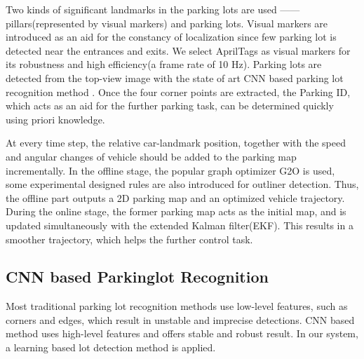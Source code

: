 \documentclass[journal]{IEEEtran}
\begin{document}
Two kinds of significant landmarks in the parking lots are used ——pillars(represented by visual markers) and parking lots. 
Visual markers are introduced as an aid for the constancy of localization since few parking lot is detected near the entrances and exits. 
We select AprilTags as visual markers for its robustness and high efficiency(a frame rate of 10 Hz). 
Parking lots are detected from the top-view image with the state of art CNN based parking lot recognition method \cite{Li2017Vision}. 
Once the four corner points are extracted, the Parking ID, which acts as an aid for the further parking task, can be determined quickly using priori knowledge.
	

At every time step, the relative car-landmark position, together with the speed and angular changes of vehicle should be added to the parking map incrementally. 
In the offline stage, the popular graph optimizer G2O is used, some experimental designed rules are also introduced for outliner detection. 
Thus, the offline part outputs a 2D parking map and an optimized vehicle trajectory. 
During the online stage, the former parking map acts as the initial map, and is updated simultaneously with the extended Kalman filter(EKF). 
This results in a smoother trajectory, which helps the further control task.


\subsection{CNN based Parkinglot Recognition}

Most traditional parking lot recognition methods use low-level features, such as corners and edges, which result in unstable and imprecise detections.
CNN based method uses high-level features and offers stable and robust result. 
In our system, a learning based lot detection method \cite{Li2017Vision} is applied.
\end{document}
